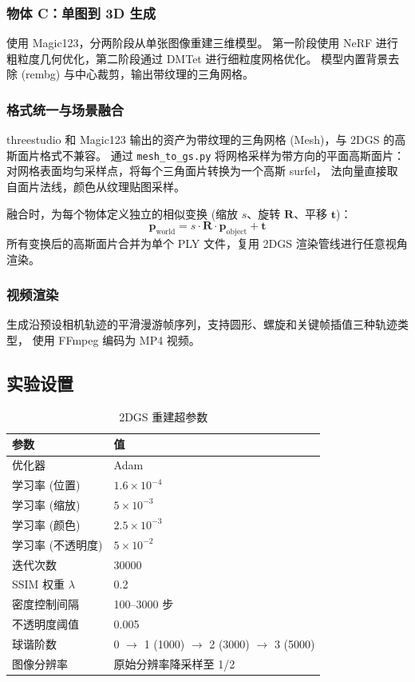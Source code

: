 \documentclass[12pt,a4paper]{ctexart}
\begin{document}
\subsubsection{物体 C：单图到 3D 生成}

使用 Magic123\cite{qian2023magic123}，分两阶段从单张图像重建三维模型。
第一阶段使用 NeRF 进行粗粒度几何优化，第二阶段通过 DMTet 进行细粒度网格优化。
模型内置背景去除 (rembg) 与中心裁剪，输出带纹理的三角网格。

\subsubsection{格式统一与场景融合}

threestudio 和 Magic123 输出的资产为带纹理的三角网格 (Mesh)，与 2DGS 的高斯面片格式不兼容。
通过 \texttt{mesh\_to\_gs.py} 将网格采样为带方向的平面高斯面片：
对网格表面均匀采样点，将每个三角面片转换为一个高斯 surfel，
法向量直接取自面片法线，颜色从纹理贴图采样。

融合时，为每个物体定义独立的相似变换 (缩放 $s$、旋转 $\mathbf{R}$、平移 $\mathbf{t}$)：
\begin{equation}
    \mathbf{p}_\text{world} = s \cdot \mathbf{R} \cdot \mathbf{p}_\text{object} + \mathbf{t}
\end{equation}
所有变换后的高斯面片合并为单个 PLY 文件，复用 2DGS 渲染管线进行任意视角渲染。

\subsubsection{视频渲染}

生成沿预设相机轨迹的平滑漫游帧序列，支持圆形、螺旋和关键帧插值三种轨迹类型，
使用 FFmpeg 编码为 MP4 视频。

\subsection{实验设置}

\begin{table}[H]
\centering
\caption{2DGS 重建超参数}
\begin{tabular}{@{}ll@{}}
\toprule
\textbf{参数} & \textbf{值} \\
\midrule
优化器 & Adam \\
学习率 (位置) & $1.6 \times 10^{-4}$ \\
学习率 (缩放) & $5 \times 10^{-3}$ \\
学习率 (颜色) & $2.5 \times 10^{-3}$ \\
学习率 (不透明度) & $5 \times 10^{-2}$ \\
迭代次数 & 30000 \\
SSIM 权重 $\lambda$ & 0.2 \\
密度控制间隔 & 100--3000 步 \\
不透明度阈值 & 0.005 \\
球谐阶数 & 0 $\to$ 1 (1000) $\to$ 2 (3000) $\to$ 3 (5000) \\
图像分辨率 & 原始分辨率降采样至 1/2 \\
\bottomrule
\end{tabular}
\end{table}
\end{document}
